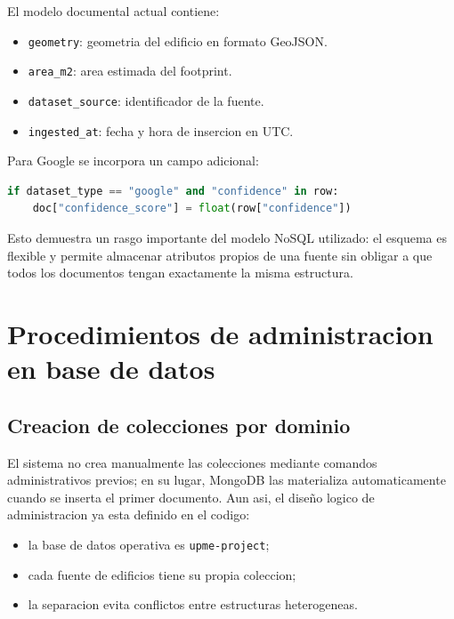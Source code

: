 \documentclass[12pt]{article}
\begin{document}
El modelo documental actual contiene:

\begin{itemize}[leftmargin=*]
    \item \texttt{geometry}: geometria del edificio en formato GeoJSON.
    \item \texttt{area\_m2}: area estimada del footprint.
    \item \texttt{dataset\_source}: identificador de la fuente.
    \item \texttt{ingested\_at}: fecha y hora de insercion en UTC.
\end{itemize}

Para Google se incorpora un campo adicional:

\begin{lstlisting}[style=basicstyle,language=Python]
if dataset_type == "google" and "confidence" in row:
    doc["confidence_score"] = float(row["confidence"])
\end{lstlisting}

Esto demuestra un rasgo importante del modelo NoSQL utilizado: el esquema es flexible y permite almacenar atributos propios de una fuente sin obligar a que todos los documentos tengan exactamente la misma estructura.

\section{Procedimientos de administracion en base de datos}

\subsection{Creacion de colecciones por dominio}

El sistema no crea manualmente las colecciones mediante comandos administrativos previos; en su lugar, MongoDB las materializa automaticamente cuando se inserta el primer documento. Aun asi, el diseño logico de administracion ya esta definido en el codigo:

\begin{itemize}[leftmargin=*]
    \item la base de datos operativa es \texttt{upme-project};
    \item cada fuente de edificios tiene su propia coleccion;
    \item la separacion evita conflictos entre estructuras heterogeneas.
\end{itemize}
\end{document}
